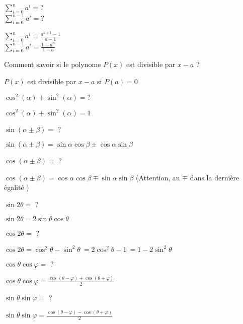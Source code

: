 \documentclass[12pt]{article}
\newcommand*{\xfield}[1]{\begin{mdframed}\centering #1\end{mdframed}\bigskip}
\newenvironment{note}{}{}
\begin{document}
\begin{note}
    \xfield{
        $\sum_{i=0}^n a^i = ? $\\        
        $\sum_{i=0}^{n-1} a^i = ? $
    }
    \xfield{$\sum_{i=0}^n a^i = \frac{a^{n+1}-1}{a-1}$\\$\sum_{i=0}^{n-1} a^i = \frac{1-a^{n}}{1-a}$}
\end{note}

\begin{note}
    \xfield{Comment savoir si le polynome $P(x)$ est divisible par $x - a$ ? }
    \xfield{$P(x)$ est divisible par $x-a$ si $P(a) = 0$}
\end{note}

\begin{note}
    \xfield{$\cos^2(\alpha) + \sin^2(\alpha) = ?$}
    \xfield{$\cos^2(\alpha) + \sin^2(\alpha) = 1$}
\end{note}

\begin{note}
    \xfield{$\sin(\alpha \pm \beta) =$ ?}
    \xfield{$\sin(\alpha \pm \beta) = \sin \alpha \cos \beta \pm \cos \alpha \sin \beta$}
\end{note}

\begin{note}
    \xfield{$\cos(\alpha \pm \beta) =$ ?}
    \xfield{$\cos(\alpha \pm \beta) = \cos \alpha \cos \beta \mp \sin \alpha \sin \beta$ (Attention, au $\mp$ dans la dernière égalité )}
\end{note}

\begin{note}
    \xfield{$\sin 2\theta =$ ?}
    \xfield{$\sin 2\theta = 2 \sin \theta \cos \theta $}
\end{note}

\begin{note}
    \xfield{$\cos 2\theta =$ ?}
    \xfield{$\cos 2\theta = \cos^2 \theta - \sin^2 \theta \ = 2 \cos^2 \theta - 1\ = 1 - 2 \sin^2 \theta$}
\end{note}

\begin{note}
    \xfield{$\cos \theta \cos \varphi =$ ?}
    \xfield{$\cos \theta \cos \varphi = \frac{\cos(\theta - \varphi) + \cos(\theta + \varphi)} {2}$}
\end{note}

\begin{note}
    \xfield{$\sin \theta \sin \varphi =$ ?}
    \xfield{$\sin \theta \sin \varphi = \frac{\cos(\theta - \varphi) - \cos(\theta + \varphi)} {2}$}
\end{note}
\end{document}
